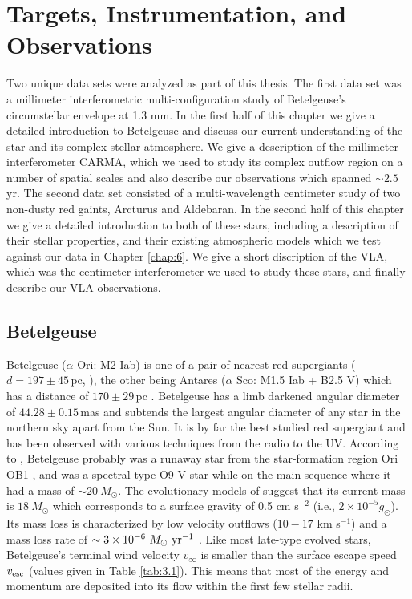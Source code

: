 
\chapter{Targets, Instrumentation, and Observations}
\label{chap:3}

Two unique data sets were analyzed as part of this thesis. The first data set was a millimeter interferometric multi-configuration study of Betelgeuse's circumstellar envelope at 1.3 mm. In the first half of this chapter we give a detailed introduction to Betelgeuse and discuss our current understanding of the star and its complex stellar atmosphere. We give a description of the millimeter interferometer CARMA, which we used to study its complex outflow region on a number of spatial scales and also describe our observations which spanned $\sim 2.5$ yr. The second data set consisted of a multi-wavelength centimeter study of two non-dusty red gaints, Arcturus and Aldebaran. In the second half of this chapter we give a detailed introduction to both of these stars, including a description of their stellar properties, and their existing atmospheric models which we test against our data in Chapter \ref{chap:6}. We give a short discription of the VLA, which was the centimeter interferometer we used to study these stars, and finally describe our VLA observations.

\section{Betelgeuse}\label{sec:3.1}
Betelgeuse ($\alpha$ Ori: M2 Iab) is one of a pair of nearest red supergiants ($d = 197 \pm 45$\,pc, \citealt{harper_2008}), the other being Antares ($\alpha$ Sco: M1.5 Iab + B2.5 V) which has a distance of $170 \pm 29$\,pc \citep{van_leeuwen_2007}. Betelgeuse has a limb darkened angular diameter of $44.28 \pm 0.15$\,mas \citep{haubois_2009} and subtends the largest angular diameter of any star in the northern sky apart from the Sun. It is by far the best studied red supergiant and has been observed with various techniques from the radio to the UV. According to \cite{harper_2001}, Betelgeuse probably was a runaway star from the star-formation region Ori OB1 \cite[see, e.g.,][]{hoogerwerf_2000}, and was a spectral type O9 V star while on the main sequence where it had a mass of $\sim 20 \ M_{\odot}$. The evolutionary models of \cite{meynet_2003} suggest that its current mass is $18 \ M_{\odot}$ which corresponds to a surface gravity of 0.5 cm s$^{-2}$  (i.e., $2\times 10^{-5}g_{\odot}$). Its mass loss is characterized by low velocity outflows ($10-17$ km s$^{-1}$) and a mass loss rate of $\sim 3\times 10^{-6} \ M_{\odot} \ \rm{yr}^{-1}$ \citep{harper_2001}. Like most late-type evolved stars, Betelgeuse's  terminal wind velocity $v_{\infty}$ is smaller than the surface escape speed $v_{\rm{esc}}$ (values given in Table \ref{tab:3.1}). This means that most of the energy and momentum are deposited into its flow within the first few stellar radii.

